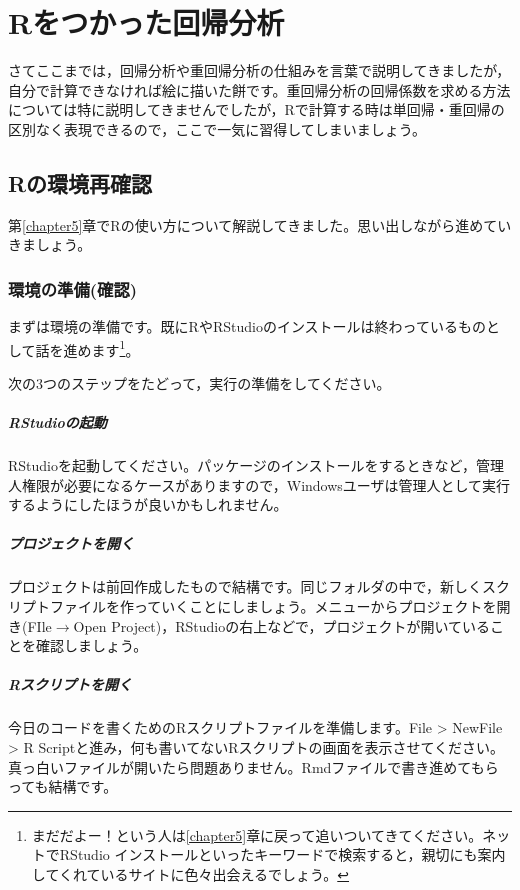\documentclass{ltjbook}
\begin{document}
 
\VerbatimFootnotes
\chapter{Rをつかった回帰分析} 
\label{chapter11} 

さてここまでは，回帰分析や重回帰分析の仕組みを言葉で説明してきましたが，自分で計算できなければ絵に描いた餅です。重回帰分析の回帰係数を求める方法については特に説明してきませんでしたが，Rで計算する時は単回帰・重回帰の区別なく表現できるので，ここで一気に習得してしまいましょう。

\section{Rの環境再確認}
第\ref{chapter5}章でRの使い方について解説してきました。思い出しながら進めていきましょう。

\subsection{環境の準備(確認)}
まずは環境の準備です。既にRやRStudioのインストールは終わっているものとして話を進めます\footnote{まだだよー！という人は\ref{chapter5}章に戻って追いついてきてください。ネットでRStudio インストールといったキーワードで検索すると，親切にも案内してくれているサイトに色々出会えるでしょう。}。

次の3つのステップをたどって，実行の準備をしてください。
\paragraph{RStudioの起動}RStudioを起動してください。パッケージのインストールをするときなど，管理人権限が必要になるケースがありますので，Windowsユーザは管理人として実行するようにしたほうが良いかもしれません。
\paragraph{プロジェクトを開く}プロジェクトは前回作成したもので結構です。同じフォルダの中で，新しくスクリプトファイルを作っていくことにしましょう。メニューからプロジェクトを開き(FIle$\to$Open Project)，RStudioの右上などで，プロジェクトが開いていることを確認しましょう。
\paragraph{Rスクリプトを開く}今日のコードを書くためのRスクリプトファイルを準備します。File > NewFile > R Scriptと進み，何も書いてないRスクリプトの画面を表示させてください。真っ白いファイルが開いたら問題ありません。Rmdファイルで書き進めてもらっても結構です。
\end{document}
